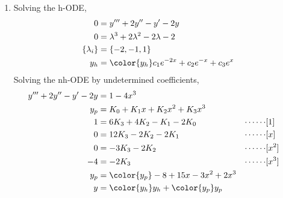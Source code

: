 \begin{enumerate}
    \item Solving the h-ODE,
          \begin{align}
              0               & = y''' + 2y'' - y' - 2y                               \\
              0               & = \lambda^{3} + 2\lambda^{2} - 2\lambda - 2           \\
              \{\lambda_{i}\} & = \{-2, -1, 1\}                                       \\
              y_{h}           & = \color{y_h} c_{1}e^{-2x} + c_{2}e^{-x} + c_{3}e^{x}
          \end{align}
          Solving the nh-ODE by undetermined coefficients,
          \begin{align}
              y''' + 2y'' - y' - 2y & = 1 - 4x^{3}                                                         \\
              y_{p}                 & = K_0 + K_1 x + K_2 x^{2} + K_3 x^{3}                                \\
              1                     & = 6K_3 + 4K_2 - K_1 - 2K_0                  & \cdots\cdots & [1]     \\
              0                     & = 12K_3 - 2K_2 - 2K_1                       & \cdots\cdots & [x]     \\
              0                     & = -3K_3 -2K_2                               & \cdots\cdots & [x^{2}] \\
              -4                    & = -2K_3                                     & \cdots\cdots & [x^{3}] \\
              y_{p}                 & = \color{y_p} -8 + 15x - 3x^{2} + 2x^{3}                             \\
              y                     & = {\color{y_h} y_{h}} + {\color{y_p} y_{p}}
          \end{align}


\end{enumerate}
